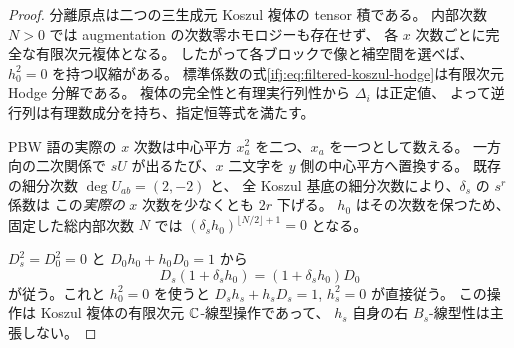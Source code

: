 \begin{proof}
分離原点は二つの三生成元 Koszul 複体の tensor 積である。
内部次数 $N>0$ では augmentation の次数零ホモロジーも存在せず、
各 $x$ 次数ごとに完全な有限次元複体となる。
したがって各ブロックで像と補空間を選べば、$h_0^2=0$ を持つ収縮がある。
標準係数の式\eqref{ifj:eq:filtered-koszul-hodge}は有限次元 Hodge 分解である。
複体の完全性と有理実行列性から $\Delta_i$ は正定値、
よって逆行列は有理数成分を持ち、指定恒等式を満たす。

PBW 語の実際の $x$ 次数は中心平方 $x_a^2$ を二つ、$x_a$ を一つとして数える。
一方向の二次関係で $sU$ が出るたび、$x$ 二文字を $y$ 側の中心平方へ置換する。
既存の細分次数 $\deg U_{ab}=(2,-2)$ と、
全 Koszul 基底の細分次数により、$\delta_s$ の $s^r$ 係数は
この\emph{実際の} $x$ 次数を少なくとも $2r$ 下げる。
$h_0$ はその次数を保つため、固定した総内部次数 $N$ では
$(\delta_sh_0)^{\lfloor N/2\rfloor+1}=0$ となる。

$D_s^2=D_0^2=0$ と $D_0h_0+h_0D_0=1$ から
\[
 D_s(1+\delta_sh_0)=(1+\delta_sh_0)D_0
\]
が従う。これと $h_0^2=0$ を使うと
$D_sh_s+h_sD_s=1$, $h_s^2=0$ が直接従う。
この操作は Koszul 複体の有限次元 $\mathbb C$-線型操作であって、
$h_s$ 自身の右 $B_s$-線型性は主張しない。
\end{proof}

